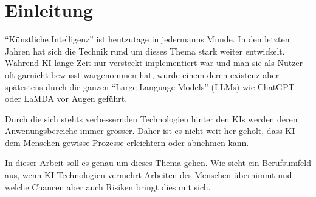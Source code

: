 \chapter{Einleitung}
\label{chap:introduction}

\enquote{Künstliche Intelligenz} ist heutzutage in jedermanns Munde. 
In den letzten Jahren hat sich die Technik rund um dieses Thema stark weiter entwickelt.
Während KI lange Zeit nur versteckt implementiert war und man sie als Nutzer oft garnicht bewusst wargenommen hat, wurde einem deren existenz aber spätestens durch die ganzen \enquote{Large Language Models} (LLMs) wie ChatGPT oder LaMDA vor Augen geführt.

Durch die sich stehts verbessernden Technologien hinter den KIs werden deren Anwenungsbereiche immer grösser.
Daher ist es nicht weit her geholt, dass KI dem Menschen gewisse Prozesse erleichtern oder abnehmen kann. 

In dieser Arbeit soll es genau um dieses Thema gehen. Wie sieht ein Berufsumfeld aus, wenn KI Technologien vermehrt Arbeiten des Menschen übernimmt und welche Chancen aber auch Risiken bringt dies mit sich.
